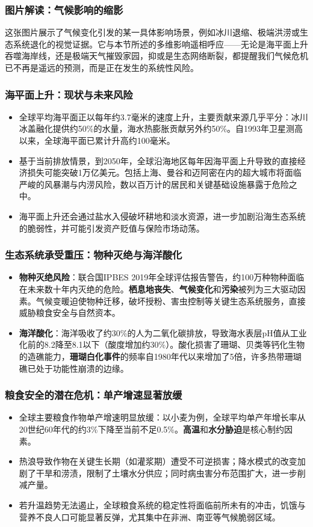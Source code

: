 \documentclass[11pt]{beamer}
\begin{document}
\begin{frame}
\frametitle{图片解读：气候影响的缩影}
这张图片展示了气候变化引发的某一具体影响场景，例如冰川退缩、极端洪涝或生态系统退化的视觉证据。它与本节所述的多维影响遥相呼应——无论是海平面上升吞噬海岸线，还是极端天气摧毁家园，抑或是生态网络断裂，都提醒我们气候危机已不再是遥远的预测，而是正在发生的系统性风险。
\end{frame}

\begin{frame}
\frametitle{海平面上升：现状与未来风险}
\begin{itemize}
\item \alert{全球平均海平面}正以每年约\alert{3.7毫米}的速度上升，主要贡献来源几乎平分：冰川冰盖融化提供约50\%的水量，海水热膨胀贡献另外约50\%。自1993年卫星测高以来，全球海平面已累计升高约\alert{100毫米}。
\item 基于当前排放情景，到\alert{2050年}，全球沿海地区每年因海平面上升导致的直接经济损失可能突破\alert{1万亿美元}。包括上海、曼谷和迈阿密在内的超大城市将面临严峻的风暴潮与内涝风险，数以百万计的居民和关键基础设施暴露于危险之中。
\item 海平面上升还会通过盐水入侵破坏耕地和淡水资源，进一步加剧沿海生态系统的脆弱性，并可能引发资产贬值与保险市场动荡。
\end{itemize}
\end{frame}

\begin{frame}
\frametitle{生态系统承受重压：物种灭绝与海洋酸化}
\begin{itemize}
\item \textbf{物种灭绝风险}：联合国IPBES 2019年全球评估报告警告，约\alert{100万种物种}面临在未来数十年内灭绝的危险。\textbf{栖息地丧失}、\textbf{气候变化}和\textbf{污染}被列为三大驱动因素。气候变暖迫使物种迁移，破坏授粉、害虫控制等关键生态系统服务，直接威胁粮食安全与自然资本。
\item \textbf{海洋酸化}：海洋吸收了约\alert{30\%}的人为二氧化碳排放，导致海水表层pH值从工业化前的8.2降至\alert{8.1以下}（酸度增加约30\%）。酸化损害了珊瑚、贝类等钙化生物的造礁能力，\textbf{珊瑚白化事件}的频率自1980年代以来增加了\alert{5倍}，许多热带珊瑚礁已处于功能性崩溃的边缘。
\end{itemize}
\end{frame}

\begin{frame}
\frametitle{粮食安全的潜在危机：单产增速显著放缓}
\begin{itemize}
\item 全球主要粮食作物单产增速明显放缓：以小麦为例，全球平均单产年增长率从20世纪60年代的约\alert{3\%}下降至当前不足\alert{0.5\%}。\textbf{高温}和\textbf{水分胁迫}是核心制约因素。
\item 热浪导致作物在关键生长期（如灌浆期）遭受不可逆损害；降水模式的改变加剧了干旱和涝渍，限制了土壤水分供应；同时病虫害分布范围扩大，进一步削减产量。
\item 若升温趋势无法遏止，全球粮食系统的稳定性将面临前所未有的冲击，饥饿与营养不良人口可能显著反弹，尤其集中在非洲、南亚等气候脆弱区域。
\end{itemize}
\end{frame}
\end{document}
